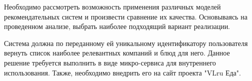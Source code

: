 Необходимо рассмотреть возможность применения различных моделей рекомендательных
систем и произвести сравнение их качества. Основываясь на проведенном анализе,
выбрать наиболее подходящий вариант реализации.

Система должна по переданному ей  уникальному идентификатору пользователя вернуть список наиболее
релевантных компаний и блюд для него. Данное решение требуется выполнить в
виде микро-сервиса для внутреннего использования. Также, необходимо внедрить его
на сайт проекта "VLru Еда".

